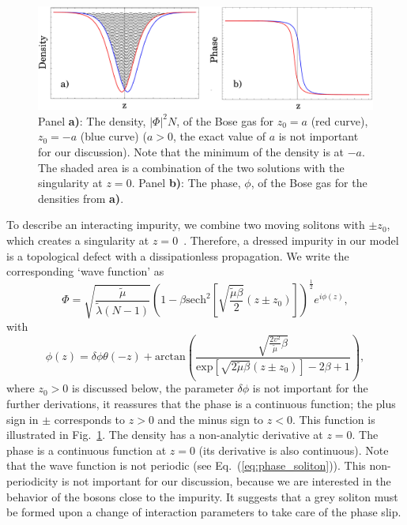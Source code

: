 \documentclass[reprint, twocolumn,amsmath,amssymb,showpacs,pra,superscriptaddress,aps]{revtex4-1}
\begin{document}
 \begin{figure}
 \centerline{\includegraphics[scale=0.45]{figure1appendix_new.pdf}}
\caption{Panel {\bf a)}: The density, $|\Phi|^2 N$, of the Bose gas for $z_0=a$ (red curve), $z_0=-a$ (blue curve) 
($a>0$, the exact value of $a$ is not important for our discussion). 
 Note that the minimum of the density is at $-a$. 
The shaded area is a combination of the two solutions with the singularity at $z=0$. 
Panel {\bf b)}: The phase, $\phi$, of the Bose gas for the densities from {\bf a)}.}
 \label{fig:Fig1}
 \end{figure}

To describe an interacting impurity, we combine two moving solitons with $\pm z_0$, which creates a singularity at $z=0$~\cite{hakim1997,kamenev2016}.
Therefore, a dressed impurity in our model is a topological defect with a dissipationless propagation. 
We write the corresponding `wave function' as
\begin{equation}
\Phi=\sqrt{\frac{\tilde \mu}{\tilde \lambda (N-1)}}\left(1-\beta \mathrm{sech}^2\left[\sqrt{\frac{\tilde\mu\beta}{2}}(z\pm z_0)\right]\right)^{\frac{1}{2}}e^{i\phi(z)},
\end{equation}
with 
\begin{equation}
\phi(z)=\delta \phi \theta(-z)+\mathrm{arctan}\left(\frac{\sqrt{\frac{2 v^2}{\tilde \mu}\beta}}{\mathrm{exp}\left[\sqrt{2\tilde \mu\beta}(z\pm z_0)\right]-2\beta+1}\right),
\label{eq:phase_soliton}
\end{equation}
where $z_0>0$ is discussed below, the parameter $\delta \phi$ is not important for the further derivations, it reassures that the phase is a continuous function;
the plus sign in $\pm$ corresponds to $z>0$ and the minus sign to $z<0$. This function is illustrated in Fig.~\ref{fig:Fig1}. 
The density has a non-analytic derivative at $z=0$. The phase is a continuous function at $z=0$ (its derivative is also continuous).
Note that the wave function is not periodic (see Eq.~(\ref{eq:phase_soliton})). This non-periodicity is not important 
for our discussion, because we are interested in the behavior of the bosons close to the impurity. It suggests that a grey soliton
must be formed upon a change of interaction parameters to take care of the phase slip.
\end{document}
